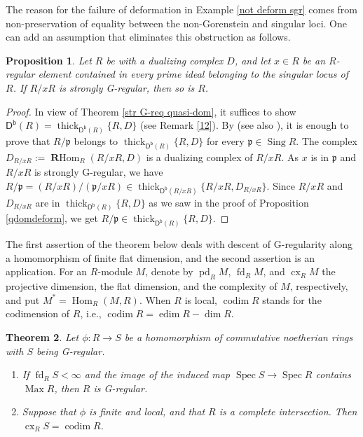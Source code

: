 \documentclass{amsart}
\newtheorem{thm}{Theorem}[section]
\newtheorem{prop}[thm]{Proposition}
\theoremstyle{definition}
\theoremstyle{remark}
\numberwithin{equation}{thm}
\def\codim{\operatorname{codim}}
\def\cx{\operatorname{cx}}
\def\Db{\operatorname{\mathsf{D^b}}}
\def\edim{\operatorname{edim}}
\def\fd{\operatorname{fd}}
\def\Hom{\operatorname{Hom}}
\def\Max{\operatorname{Max}}
\def\pd{\operatorname{pd}}
\def\p{\mathfrak{p}}
\def\RHom{\operatorname{\mathbf{R}Hom}}
\def\sing{\operatorname{Sing}}
\def\spec{\operatorname{Spec}}
\def\thick{\operatorname{thick}}
\begin{document}
The reason for the failure of deformation in Example \ref{not deform sgr} comes from non-preservation of equality between the non-Gorenstein and singular loci.
One can add an assumption that eliminates this obstruction as follows.

\begin{prop}\label{sgr reg}
Let $R$ be with a dualizing complex $D$, and let $x\in R$ be an $R$-regular element contained in every prime ideal belonging to the singular locus of $R$. If $R/xR$ is strongly G-regular, then so is $R$.
\end{prop}

\begin{proof}
In view of Theorem \ref{str G-req quasi-dom}, it suffices to show $\Db(R)=\thick_{\Db(R)}\{R, D\}$ (see Remark \ref{12}).
By \cite[Main Theorem]{Sc03} (see also \cite[Corollary 1.3]{thgen}), it is enough to prove that $R/\p$ belongs to $\thick_{\Db(R)}\{R, D\}$ for every $\p\in\sing R$. 
The complex $D_{R/xR}:=\RHom_R(R/xR, D)$ is a dualizing complex of $R/xR$.
As $x$ is in $\p$ and $R/xR$ is strongly G-regular, we have  $R/\p=(R/xR)/(\p/xR)\in\thick_{\Db(R/xR)}\{ R/xR, D_{R/xR}\}$.
Since $R/xR$ and $D_{R/xR}$ are in $\thick_{\Db(R)}\{R, D\}$ as we saw in the proof of Proposition \ref{qdomdeform}, we get $R/\p\in \thick_{\Db(R)}\{R, D\}$.
\end{proof}

The first assertion of the theorem below deals with descent of G-regularity along a homomorphism of finite flat dimension, and the second assertion is an application.
For an $R$-module $M$, denote by $\pd_R M$, $\fd_R M$, and $\cx_R M$ the projective dimension, the flat dimension, and the complexity of $M$, respectively, and put $M^\ast=\Hom_R(M,R)$.
When $R$ is local, $\codim R$ stands for the codimension of $R$, i.e., $\codim R=\edim R-\dim R$.

\begin{thm}\label{13}
Let $\phi:R \to S$ be a homomorphism of commutative noetherian rings with $S$ being G-regular.
\begin{enumerate}[\rm(1)]
\item
If $\fd_R S < \infty$ and the image of the induced map $\spec S \to \spec R$ contains $\Max R$, then $R$ is G-regular.
\item
Suppose that $\phi$ is finite and local, and that $R$ is a complete intersection.
Then $\cx_R S = \codim R$.
\end{enumerate}
\end{thm}
\end{document}
